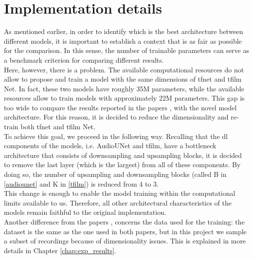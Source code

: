 \section{Implementation details} \label{implementation_details}
As mentioned earlier, in order to identify which is the best architecture between different models, it is important to establish a context that is as fair as possible for the comparison. In this sense, the number of trainable parameters can serve as a benchmark criterion for comparing different results. \\ Here, however, there is a problem. The available computational resources do not allow to propose and train a model with the same dimensions of \gls{tfnet} and \gls{tfilm} Net. In fact, these two models have roughly 35M parameters, while the available resources allow to train models with approximately 22M parameters. This gap is too wide to compare the results reported in the papers \cite{lim2018time}, \cite{birnbaum2019temporal} with the novel model architecture. For this reason, it is decided to reduce the dimensionality and re-train both \gls{tfnet} and \gls{tfilm} Net. \\
To achieve this goal, we proceed in the following way. Recalling that the \gls{dl} components of the models, i.e. AudioUNet and \gls{tfilm}, have a bottleneck architecture that consists of downsampling and upsampling blocks, it is decided to remove the last layer (which is the largest) from all of these components. By doing so, the number of upsampling and downsampling blocks (called B in \ref{audiounet} and K in \ref{tfilm}) is reduced from 4 to 3.\\
This change is enough to enable the model training within the computational limits available to us. Therefore, all other architectural characteristics of the models remain faithful to the original implementation.\\
Another difference from the papers \cite{lim2018time}, \cite{birnbaum2019temporal} concerns the data used for the training: the dataset is the same as the one used in both papers, but in this project we sample a subset of recordings because of dimensionality issues. This is explained in more details in Chapter \ref{chap:exp_results}. 

